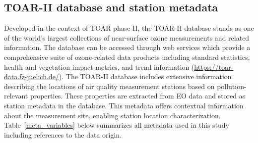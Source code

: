 \documentclass[gmd, manuscript]{copernicus}
\begin{document}

\subsection{TOAR-II database and station metadata}
Developed in the context of TOAR phase II, the TOAR-II database stands as one of the world's largest collections of near-surface ozone measurements and related information. The database can be accessed through web services which provide a comprehensive suite of ozone-related data products including standard statistics, health and vegetation impact metrics, and trend information (\href{https://toar-data.fz-juelich.de/}{https://toar-data.fz-juelich.de/}). The TOAR-II database includes extensive information describing the locations of air quality measurement stations based on pollution-relevant properties. These properties are extracted from EO data and stored as station metadata in the database. This metadata offers contextual information about the measurement site, enabling station location characterization. Table~\ref{meta_variables} below summarizes all metadata used in this study including references to the data origin.
\end{document}
